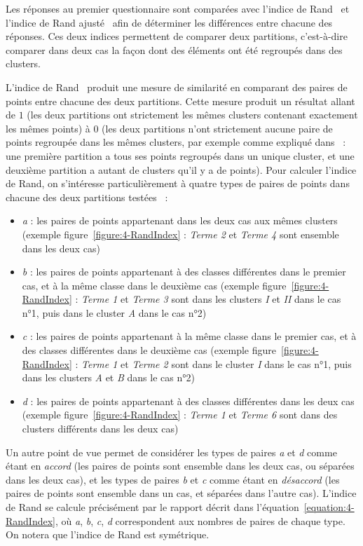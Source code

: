 \bigskip

Les réponses au premier questionnaire sont comparées avec l'indice de Rand~\cite{rand1971objective} et l'indice de Rand ajusté~\cite{hubert1985comparing} afin de déterminer les différences entre chacune des réponses.
Ces deux indices permettent de comparer deux partitions, c'est-à-dire comparer dans deux cas la façon dont des éléments ont été regroupés dans des clusters.

L'indice de Rand~\cite{rand1971objective} produit une mesure de similarité en comparant des paires de points entre chacune des deux partitions.
Cette mesure produit un résultat allant de $ 1 $ (les deux partitions ont strictement les mêmes clusters contenant exactement les mêmes points) à $ 0 $ (les deux partitions n'ont strictement aucune paire de points regroupée dans les mêmes clusters, par exemple comme expliqué dans~\cite{rand1971objective} : une première partition a tous ses points regroupés dans un unique cluster, et une deuxième partition a autant de clusters qu'il y a de points).
Pour calculer l'indice de Rand, on s'intéresse particulièrement à quatre types de paires de points dans chacune des deux partitions testées~\cite{hubert1985comparing}\cite{steinley2004properties} :
\begin{itemize}
\item \textit{a} : les paires de points appartenant dans les deux cas aux mêmes clusters (exemple figure~\ref{figure:4-RandIndex} : \textit{Terme 2} et \textit{Terme 4} sont ensemble dans les deux cas)
\item \textit{b} : les paires de points appartenant à des classes différentes dans le premier cas, et à la même classe dans le deuxième cas (exemple figure~\ref{figure:4-RandIndex} : \textit{Terme 1} et \textit{Terme 3} sont dans les clusters \textit{I} et \textit{II} dans le cas n°1, puis dans le cluster \textit{A} dans le cas n°2)
\item \textit{c} : les paires de points appartenant à la même classe dans le premier cas, et à des classes différentes dans le deuxième cas (exemple figure~\ref{figure:4-RandIndex} : \textit{Terme 1} et \textit{Terme 2} sont dans le cluster \textit{I} dans le cas n°1, puis dans les clusters \textit{A} et \textit{B} dans le cas n°2)
\item \textit{d} : les paires de points appartenant à des classes différentes dans les deux cas (exemple figure~\ref{figure:4-RandIndex} : \textit{Terme 1} et \textit{Terme 6} sont dans des clusters différents dans les deux cas)
\end{itemize}
Un autre point de vue permet de considérer les types de paires \textit{a} et \textit{d} comme étant en \textit{accord} (les paires de points sont ensemble dans les deux cas, ou séparées dans les deux cas), et les types de paires \textit{b} et \textit{c} comme étant en \textit{désaccord} (les paires de points sont ensemble dans un cas, et séparées dans l'autre cas).
L'indice de Rand se calcule précisément par le rapport décrit dans l'équation~\eqref{equation:4-RandIndex}, où \textit{a}, \textit{b}, \textit{c}, \textit{d} correspondent aux nombres de paires de chaque type.
On notera que l'indice de Rand est symétrique.

